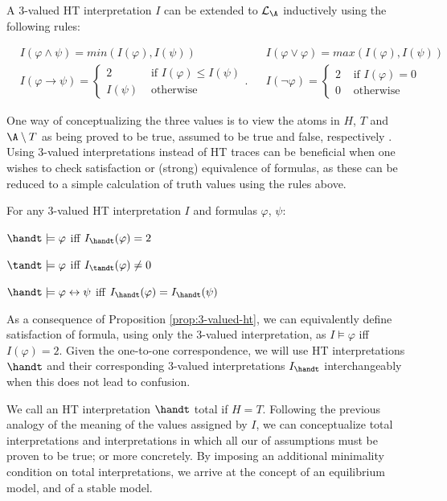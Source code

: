 A 3-valued HT interpretation $I$ can be extended to
$\mathcal{L}_\A$ inductively using the following rules:

\begin{align*}
&I(\varphi \wedge \psi) = min(I(\varphi),I(\psi)) 
&&I(\varphi \vee \varphi) = max(I(\varphi),I(\psi)) \\
&I(\varphi \rightarrow \psi) = 
\begin{cases}
  2 & \text { if } I(\varphi) \leq I(\psi) \\
  I(\psi) & \text { otherwise }
\end{cases}.
&&I(\neg \varphi) = \begin{cases}2 
  & \text { if } I(\varphi)=0 \\ 
  0 & \text { otherwise }\end{cases} 
\end{align*}

One way of conceptualizing the three values is to view the atoms in
$H$, $T$ and $\A \setminus T$ as being proved to be true, assumed to
be true and false, respectively \cite{agcadipescscvi20a}. Using
3-valued interpretations instead of HT traces can be beneficial when
one wishes to check satisfaction or (strong) equivalence of formulas,
as these can be reduced to a simple calculation of truth values using
the rules above.

\begin{proposition}\label{prop:3-valued-ht}
For any 3-valued HT interpretation $I$ and formulas $\varphi$, $\psi$:
\begin{description}
  \item $\handt \models \varphi$ iff $I_{\handt}(\varphi) = 2$
  \item $\tandt \models \varphi$ iff $I_{\tandt}(\varphi) \neq 0$
  \item $\handt \models \varphi \leftrightarrow \psi$ iff $I_{\handt}(\varphi) = I_{\handt}(\psi)$
\end{description}
\end{proposition}

As a consequence of Proposition \ref{prop:3-valued-ht}, we can
equivalently define satisfaction of formula, using only the 3-valued
interpretation, as $I \models \varphi$ iff $I(\varphi)=2$. Given the
one-to-one correspondence, we will use HT interpretations $\handt$ and
their corresponding 3-valued interpretations $I_{\handt}$
interchangeably when this does not lead to confusion.

We call an HT interpretation $\handt$ total if $H=T$. Following the
previous analogy of the meaning of the values assigned by $I$, we can
conceptualize total interpretations and interpretations in which all
our of assumptions must be proven to be true; or more concretely. By
imposing an additional minimality condition on total interpretations,
we arrive at the concept of an equilibrium model, and of a stable
model.

